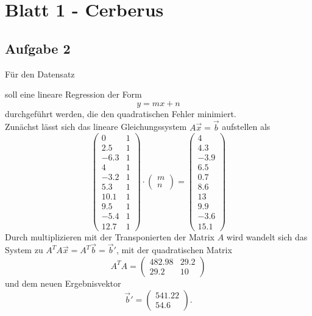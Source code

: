 \documentclass{article}
\begin{document}
\section*{Blatt 1 - Cerberus}
\subsection*{Aufgabe 2}
Für den Datensatz
\begin{table}[]
    \centering

\end{table}
soll eine lineare Regression der Form
\[
y = mx + n
\]
durchgeführt werden, die den quadratischen Fehler minimiert.\\
Zunächst lässt sich das lineare Gleichungssystem $A\vec{x}=\vec{b}$ aufstellen als
\[
\begin{pmatrix}
   0  & 1\\
 2.5  & 1\\
-6.3  & 1\\
   4  & 1\\ 
-3.2  & 1\\
 5.3  & 1\\
10.1  & 1\\
 9.5  & 1\\
-5.4  & 1\\
12.7  & 1
\end{pmatrix}\cdot
\begin{pmatrix}
m\\
n
\end{pmatrix} = 
\begin{pmatrix}
4\\
4.3\\
-3.9\\
6.5\\
0.7\\
8.6\\
13\\
9.9\\
-3.6\\
15.1
\end{pmatrix}
\]
Durch multiplizieren mit der Transponierten der Matrix $A$ wird wandelt sich das
System zu $A^TA\vec{x} = A^T \vec{b} = \vec{b}'$, mit der quadratischen Matrix
\[
A^TA = \begin{pmatrix}
482.98 & 29.2 \\
  29.2  &  10 
\end{pmatrix}
\]
und dem neuen Ergebnisvektor
\[
\vec{b}' = \begin{pmatrix}
541.22\\
  54.6
\end{pmatrix}\text{.}
\]
\end{document}
